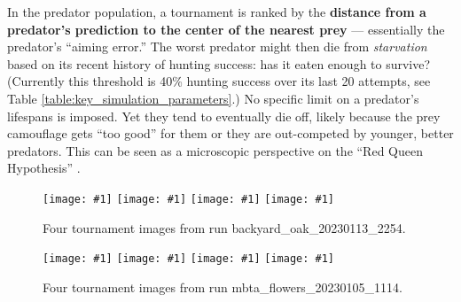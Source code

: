 \documentclass[letterpaper]{article}
\newcommand{\jargon}[1]{\textit{#1}}
\newcommand{\runID}{\footnotesize}
\newcommand{\igfour}[1]{\texttt{[image: \#1]}}
\begin{document}
\par
In the predator population, a tournament is ranked by the \textbf{distance from a predator's prediction to the center of the nearest prey} --- essentially the predator's ``aiming error.'' The worst predator might then die from \jargon{starvation} based on its recent history of hunting success: has it eaten enough to survive? (Currently this threshold is 40\% hunting success over its last 20 attempts, see Table \ref{table:key_simulation_parameters}.) No specific limit on a predator's lifespans is imposed. Yet they tend to eventually die off, likely because the prey camouflage gets ``too good'' for them or they are out-competed by younger, better predators. This can be seen as a microscopic perspective on the ``Red Queen Hypothesis'' \citep{van_valen_new_1973}.


\begin{figure}[t]
    \igfour{20230115_step_6902.png}
    \hfill
    \igfour{20230115_step_7682.png}
    \hfill
    \igfour{20230115_step_7942.png}
    \hfill
    \igfour{20230115_step_12413.png}
    \caption{Four tournament images from run {\runID backyard\_oak\_20230113\_2254}.}
    \label{fig:backyard_oak_4x}
\end{figure}

\begin{figure}[t]
    \igfour{20230106_step_11019.png}
    \hfill
    \igfour{20230106_step_11204.png}
    \hfill
    \igfour{20230106_step_11689.png}
    \hfill
    \igfour{20230106_step_11995.png}
    \caption{Four tournament images from run {\runID mbta\_flowers\_20230105\_1114}.}
    \label{fig:mbta_flowers_4x}
\end{figure}

\end{document}
